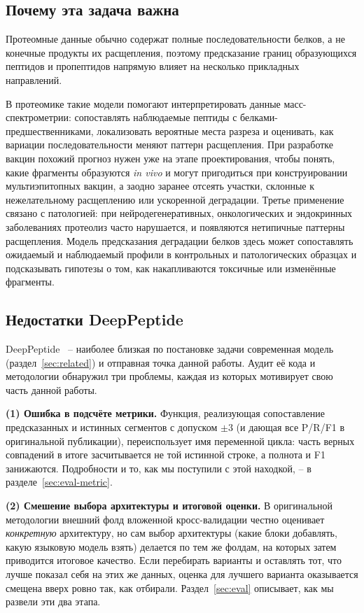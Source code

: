 \documentclass{article}
\begin{document}
\subsection{Почему эта задача важна}

Протеомные данные обычно содержат полные последовательности белков, а не конечные продукты их расщепления, поэтому предсказание границ образующихся пептидов и пропептидов напрямую влияет на несколько прикладных направлений.

В протеомике такие модели помогают интерпретировать данные масс-спектрометрии: сопоставлять наблюдаемые пептиды с белками-предшественниками, локализовать вероятные места разреза и оценивать, как вариации последовательности меняют паттерн расщепления. При разработке вакцин похожий прогноз нужен уже на этапе проектирования, чтобы понять, какие фрагменты образуются \textit{in vivo} и могут пригодиться при конструировании мультиэпитопных вакцин, а заодно заранее отсеять участки, склонные к нежелательному расщеплению или ускоренной деградации. Третье применение связано с патологией: при нейродегенеративных, онкологических и эндокринных заболеваниях протеолиз часто нарушается, и появляются нетипичные паттерны расщепления. Модель предсказания деградации белков здесь может сопоставлять ожидаемый и наблюдаемый профили в контрольных и патологических образцах и подсказывать гипотезы о том, как накапливаются токсичные или изменённые фрагменты.

\subsection{Недостатки DeepPeptide}
\label{sec:intro-flaws}

DeepPeptide~\cite{deeppeptide2023} -- наиболее близкая по постановке задачи современная модель (раздел~\ref{sec:related}) и отправная точка данной работы. Аудит её кода и методологии обнаружил три проблемы, каждая из которых мотивирует свою часть данной работы.

\textbf{(1) Ошибка в подсчёте метрики.} Функция, реализующая сопоставление предсказанных и истинных сегментов с допуском $\pm3$ (и дающая все P/R/F1 в оригинальной публикации), переиспользует имя переменной цикла: часть верных совпадений в итоге засчитывается не той истинной строке, а полнота и F1 занижаются. Подробности и то, как мы поступили с этой находкой, -- в разделе~\ref{sec:eval-metric}.

\textbf{(2) Смешение выбора архитектуры и итоговой оценки.} В оригинальной методологии внешний фолд вложенной кросс-валидации честно оценивает \emph{конкретную} архитектуру, но сам выбор архитектуры (какие блоки добавлять, какую языковую модель взять) делается по тем же фолдам, на которых затем приводится итоговое качество. Если перебирать варианты и оставлять тот, что лучше показал себя на этих же данных, оценка для лучшего варианта оказывается смещена вверх ровно так, как отбирали. Раздел~\ref{sec:eval} описывает, как мы развели эти два этапа.
\end{document}
